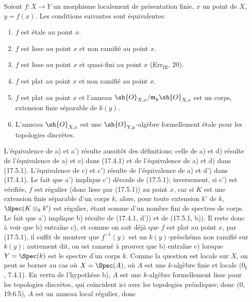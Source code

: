 \begin{theorem}[17.6.1]
\label{IV.17.6.1}
Soient $f:X\to Y$ un morphisme localement de présentation finie, $x$ un point de $X$, $y=f(x)$. Les conditions suivantes sont équivalentes:
\begin{enumerate}
  \item[a)] $f$ est étale au point $x$.
  \item[a')] $f$ est lisse au point $x$ et non ramifié au point $x$.
  \item[b)] $f$ est lisse au point $x$ et quasi-fini au point $x$ (Err$_{\mathrm{III}}$, 20).
  \item[c)] $f$ est plat au point $x$ et non ramifié au point $x$.
  \item[c')] $f$ est plat au point $x$ et l'anneau $\sh{O}_{X,x}/\mathfrak m_y\sh{O}_{X,x}$ est un corps, extension finie séparable de $k(y)$.
  \item[d)] L'anneau $\sh{O}_{X,x}$ est une $\sh{O}_{Y,y}$-algèbre formellement étale pour les topologies discrètes.
\end{enumerate}
\end{theorem}

L'équivalence de a) et a') résulte aussitôt des définitions; celle de a) et d) résulte de l'équivalence de a) et e) dans (17.4.1) et de l'équivalence de a) et d) dans (17.5.1). L'équivalence de c) et c') résulte de l'équivalence de a) et d') dans (17.4.1). Le fait que a') implique c') découle de (17.5.1); inversement, si c') est vérifiée, $f$ est régulier (donc lisse par (17.5.1)) au point $x$, car si $K$ est une extension finie séparable d'un corps $k$, alors, pour toute extension $k'$ de $k$, $\Spec(K\otimes_k k')$ est régulier, étant somme d'un nombre fini de spectres de corps. Le fait que a') implique b) résulte de (17.4.1, d')) et de (17.5.1, b)). Il reste donc à voir que b) entraîne c), et comme on sait déjà que $f$ est plat au point $x$, par (17.5.1), il suffit de montrer que $f^{-1}(y)$ est un $k(y)$-préschéma non ramifié sur $k(y)$; autrement dit, on est ramené à prouver que b) entraîne c) lorsque $Y=\Spec(k)$ est le spectre d'un corps $k$. Comme la question est locale sur $X$, on peut se borner au cas où $X=\Spec(A)$, où $A$ est une $k$-algèbre finie et locale ($0_{\mathrm I}$, 7.4.1). En vertu de l'hypothèse b), $A$ est une $k$-algèbre formellement lisse pour les topologies discrètes, qui coïncident ici avec les topologies préadiques; donc (0, 19.6.5), $A$ est un anneau local régulier, donc

